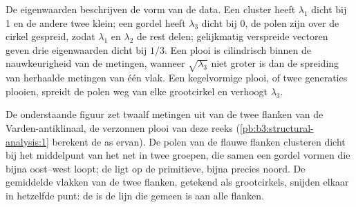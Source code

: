 De eigenwaarden beschrijven de vorm van de data. Een cluster heeft $\lambda_1$ dicht bij
1 en de andere twee klein; een gordel heeft $\lambda_3$ dicht bij 0, de polen zijn
over de cirkel gespreid, zodat $\lambda_1$ en $\lambda_2$ de rest delen;
gelijkmatig verspreide vectoren geven drie eigenwaarden dicht bij $1/3$. Een plooi is
cilindrisch binnen de nauwkeurigheid van de metingen, wanneer $\sqrt{\lambda_3}$
niet groter is dan de spreiding van herhaalde metingen van één vlak. Een kegelvormige plooi,
of twee generaties plooien, spreidt de polen weg van elke grootcirkel
en verhoogt $\lambda_3$.

De onderstaande figuur zet twaalf metingen uit van de twee flanken van de Varden-antiklinaal,
de verzonnen plooi van deze reeks (\cref{pb:b3:structural-analysis:1}
berekent de as ervan). De polen van de flauwe flanken clusteren dicht bij het middelpunt van het net
in twee groepen, die samen een gordel vormen die bijna oost--west loopt;
de  ligt op de primitieve, bijna precies noord. De gemiddelde
vlakken van de twee flanken, getekend als grootcirkels, snijden elkaar in hetzelfde punt:
de  is de lijn die gemeen is aan alle flanken.

